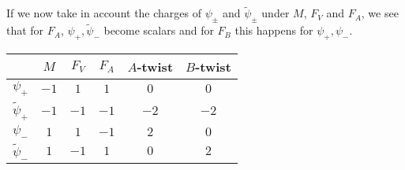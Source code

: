 \documentclass{article}
\newcommand{\p}{\partial}
\newcommand{\tth}{\tl{\theta}}
\def\tl{\tilde}
\theoremstyle{definition}
\theoremstyle{definition}
\theoremstyle{remark}
\begin{document}
%
If we now take in account the charges of $\psi_\pm$ and $\tl{\psi}_\pm$ under $M$, $F_V$ and $F_A$, we see that for $F_A$, $\psi_+,\tl{\psi}_-$ become scalars and for $F_B$ this happens for $\psi_+,\psi_-$.
\begin{center}
\begin{tabular}{c|ccc|cc}
			 & $M$ & $F_V$ & $F_A$ & $A$-twist & $B$-twist\\ \hline
$\psi_+$	 & $-1$& $1$   & $1$   & $0$       & $0$ \\
$\tl{\psi}_+$& $-1$& $-1$  & $-1$  & $-2$      & $-2$ \\
$\psi_-$	 & $1$& $1$   & $-1$  & $2$       & $0$ \\
$\tl{\psi}_-$& $1$& $-1$  & $1$  & $0$      & $2$ \\
\end{tabular}
\end{center}
\end{document}
